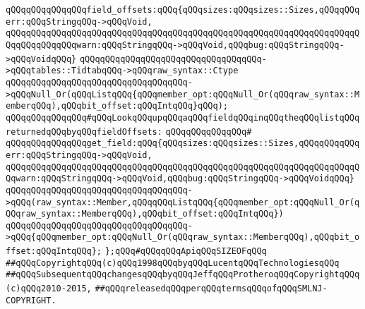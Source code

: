 \verb|qQQqqQQqqQQqqQQqfield_offsets:qQQq{qQQqsizes:qQQqsizes::Sizes,qQQqqQQqerr:qQQqStringqQQq->qQQqVoid,|\newline
\verb|qQQqqQQqqQQqqQQqqQQqqQQqqQQqqQQqqQQqqQQqqQQqqQQqqQQqqQQqqQQqqQQqqQQqqQQqqQQqqQQqqQQqwarn:qQQqStringqQQq->qQQqVoid,qQQqbug:qQQqStringqQQq->qQQqVoidqQQq}|\newline
\verb|qQQqqQQqqQQqqQQqqQQqqQQqqQQqqQQqqQQq->qQQqtables::TidtabqQQq->qQQqraw_syntax::Ctype|\newline
\verb|qQQqqQQqqQQqqQQqqQQqqQQqqQQqqQQqqQQq->qQQqNull_Or(qQQqListqQQq{qQQqmember_opt:qQQqNull_Or(qQQqraw_syntax::MemberqQQq),qQQqbit_offset:qQQqIntqQQq}qQQq);|\newline
\newline
\verb|qQQqqQQqqQQqqQQq#qQQqLookqQQqupqQQqaqQQqfieldqQQqinqQQqtheqQQqlistqQQqreturnedqQQqbyqQQqfieldOffsets:|\newline
\verb|qQQqqQQqqQQqqQQq#|\newline
\verb|qQQqqQQqqQQqqQQqget_field:qQQq{qQQqsizes:qQQqsizes::Sizes,qQQqqQQqqQQqerr:qQQqStringqQQq->qQQqVoid,|\newline
\verb|qQQqqQQqqQQqqQQqqQQqqQQqqQQqqQQqqQQqqQQqqQQqqQQqqQQqqQQqqQQqqQQqqQQqqQQqwarn:qQQqStringqQQq->qQQqVoid,qQQqbug:qQQqStringqQQq->qQQqVoidqQQq}|\newline
\verb|qQQqqQQqqQQqqQQqqQQqqQQqqQQqqQQqqQQq->qQQq(raw_syntax::Member,qQQqqQQqListqQQq{qQQqmember_opt:qQQqNull_Or(qQQqraw_syntax::MemberqQQq),qQQqbit_offset:qQQqIntqQQq})|\newline
\verb|qQQqqQQqqQQqqQQqqQQqqQQqqQQqqQQqqQQq->qQQq{qQQqmember_opt:qQQqNull_Or(qQQqraw_syntax::MemberqQQq),qQQqbit_offset:qQQqIntqQQq};|\newline
\newline
\verb|};qQQq#qQQqqQQqApiqQQqSIZEOFqQQq|\newline
\newline
\newline
\verb|##qQQqCopyrightqQQq(c)qQQq1998qQQqbyqQQqLucentqQQqTechnologiesqQQq|\newline
\verb|##qQQqSubsequentqQQqchangesqQQqbyqQQqJeffqQQqProtheroqQQqCopyrightqQQq(c)qQQq2010-2015,|\newline
\verb|##qQQqreleasedqQQqperqQQqtermsqQQqofqQQqSMLNJ-COPYRIGHT.|\newline


